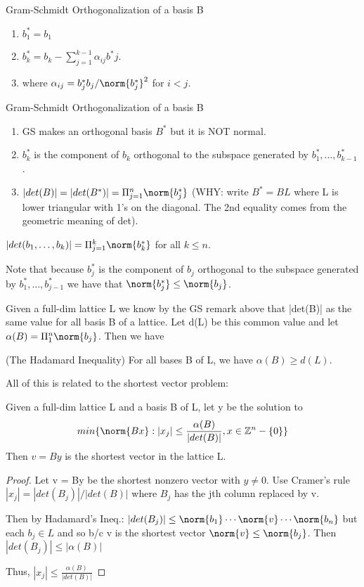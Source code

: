 \begin{definition}
Gram-Schmidt Orthogonalization of a basis B
\begin{enumerate}
	\item $b^*_1 = b_1$
	\item $b^*_k =  b_k - \sum_{j=1}^{k-1}\alpha_{ij}b^*j$.
	\item where $\alpha_{ij} = b^*_jb_j / \norm{b^*_j}^2$ for $i < j$.
\end{enumerate}
\end{definition}


\begin{remark}
Gram-Schmidt Orthogonalization of a basis B
\begin{enumerate}
	\item GS makes an orthogonal basis $B^*$ but it is NOT normal.
	\item $b^*_k$ is the component of $b_k$ orthogonal to the subspace generated by $b^*_1, \dots, b^*_{k-1}$.
	\item $|det(B)| = | det(B^*)| = \Pi_{j=1}^n \norm{b^*_j}$ (WHY: write $B^* = B L$ where L is lower triangular with 1's on the diagonal. The 2nd equality comes from the geometric meaning of det).
\end{enumerate}
\end{remark}



\begin{definition}
$| det(b_1, \dots, b_k) | = \Pi_{j=1}^k \norm{b^*_k}$ for all $k \leq n$.
\end{definition}


Note that because $b^*_j$ is the component of $b_j$ orthogonal to the subspace generated by $b^*_1, \dots, b^*_{j-1}$ we have that $\norm{b^*_j} \leq \norm{b_j}$. 

Given a full-dim lattice L we know by the GS remark above that |det(B)| as the same value for all basis B of a lattice. Let d(L) be this common value and let $\alpha(B) = \Pi_1^n \norm{b_j}$. Then we have

\begin{remark}(The Hadamard Inequality) For all bases B of L, we have $\alpha(B) \geq d(L)$.
\end{remark}


All of this is related to the shortest vector problem:


\begin{theorem}
Given a full-dim lattice L and a basis B of L, let y be the solution to
\[ min\{ \norm{Bx} : |x_j| \leq \frac{\alpha(B)}{|det(B)|}, x \in \Z^n-\{0\}\}\]
Then $v = By$ is the shortest vector in the lattice L.
\end{theorem}
\begin{proof}
Let v = By be the shortest nonzero vector with $y\neq 0$. Use Cramer's rule $|x_j| = |det(B_j)|/|det(B)|$ where $B_j$ has the jth column replaced by v.  

Then by Hadamard's Ineq.: $|det(B_j)| \leq \norm{b_1} \cdots \norm{v} \cdots \norm{b_n}$ but each $b_j \in L$ and so b/c v is the shortest vector $\norm{v} \leq \norm{b_j}$. Then $|det(B_j) | \leq |\alpha(B)|$

Thus, $|x_j| \leq \frac{\alpha(B)}{|det(B)|}$
\end{proof}


